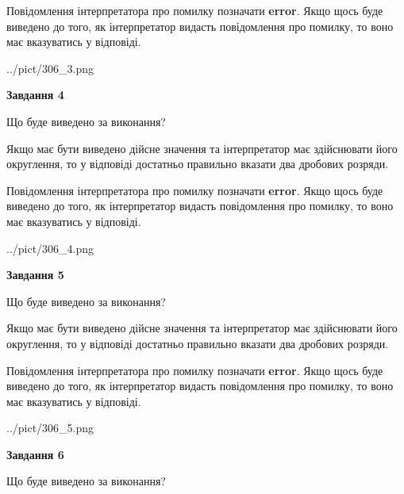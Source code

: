 \documentclass[12pt, ukrainian]{article}
\begin{document}
{\begin {Large}
Повідомлення інтерпретатора про помилку позначати \textbf{error}.
Якщо щось буде виведено до того, як інтерпретатор видасть повідомлення про помилку, 
то воно має вказуватись у відповіді. \par

\begin{center}
	{../pict/306_3.png}
\end{center}
\newpage

{\begin {center}\textbf{Завдання 4}\end {center}}\par
Що буде виведено за виконання? \par

Якщо має бути виведено дійсне значення та інтерпретатор має здійснювати його округлення, 
то у відповіді достатньо правильно вказати два дробових розряди.

Повідомлення інтерпретатора про помилку позначати \textbf{error}.
Якщо щось буде виведено до того, як інтерпретатор видасть повідомлення про помилку, 
то воно має вказуватись у відповіді. \par

\begin{center}
	{../pict/306_4.png}
\end{center}
\newpage

{\begin {center}\textbf{Завдання 5}\end {center}}\par
Що буде виведено за виконання? \par

Якщо має бути виведено дійсне значення та інтерпретатор має здійснювати його округлення, 
то у відповіді достатньо правильно вказати два дробових розряди.

Повідомлення інтерпретатора про помилку позначати \textbf{error}.
Якщо щось буде виведено до того, як інтерпретатор видасть повідомлення про помилку, 
то воно має вказуватись у відповіді. \par

\begin{center}
	{../pict/306_5.png}
\end{center}
\newpage

{\begin {center}\textbf{Завдання 6}\end {center}}\par
Що буде виведено за виконання? \par


\end{Large}}
\end{document}
